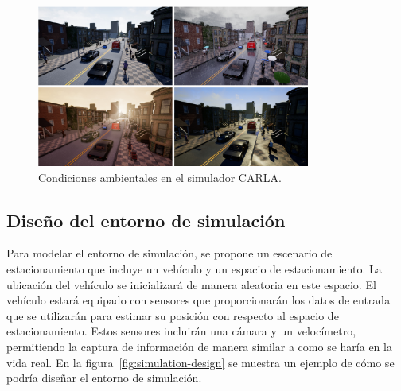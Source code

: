 \begin{figure}[!ht]
    \centering
    \includegraphics[width=0.8\textwidth]{img/carla_clima_example}
    \caption{Condiciones ambientales en el simulador CARLA.}
    \label{fig:carla-simulator}
\end{figure}


\subsection{Diseño del entorno de simulación}\label{subsec:simulation-design}
\noindent
Para modelar el entorno de simulación, se propone un escenario de estacionamiento que incluye un vehículo y un espacio de estacionamiento.
La ubicación del vehículo se inicializará de manera aleatoria en este espacio.
El vehículo estará equipado con sensores que proporcionarán los datos de entrada que se utilizarán para estimar su posición con respecto al espacio de estacionamiento.
Estos sensores incluirán una cámara y un velocímetro, permitiendo la captura de información de manera similar a como se haría en la vida real.
En la figura~\ref{fig:simulation-design} se muestra un ejemplo de cómo se podría diseñar el entorno de simulación.

